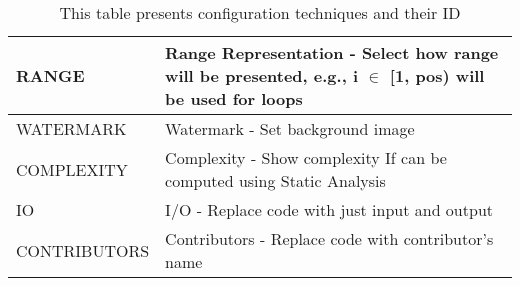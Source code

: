 \begin{table}[H]
\begin{tabular}{|l|p{14cm}|}
RANGE        & Range Representation - Select how range will be presented, e.g., i $ \in $ {[}1, pos) will be used for loops                       \\ \hline
WATERMARK    & Watermark - Set background image                                                                                                   \\ \hline
COMPLEXITY   & Complexity - Show complexity If can be computed using Static Analysis                                                              \\ \hline
IO           & I/O - Replace code with just input and output                                                                                      \\ \hline
CONTRIBUTORS & Contributors - Replace code with contributor's name                                                                                \\ \hline
\end{tabular}
\caption{This table presents configuration techniques and their ID}
\label{tab14}
\end{table}

